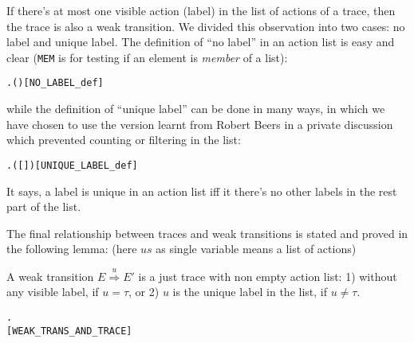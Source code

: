 If there's at most one visible action (label) in the list of actions of a trace,
then the trace is also a weak transition. We divided this observation
into two cases: no label and unique label. The definition of ``no
label'' in an action list is easy and clear (\texttt{MEM} is for
testing if an element is \emph{member} of a list):
\begin{alltt}
\HOLTokenTurnstile{}   \HOLSymConst{\HOLTokenEquiv{}} \HOLSymConst{\HOLTokenNeg{}}\HOLSymConst{\HOLTokenExists{}}.  ( ) \hfill{[NO_LABEL_def]}
\end{alltt}
while the definition of ``unique label'' can be done in many ways, in
which we have chosen to use the version learnt from Robert Beers in
a private discussion which prevented counting or filtering in the list:
\begin{alltt}
\HOLTokenTurnstile{}    \HOLSymConst{\HOLTokenEquiv{}}
   \HOLSymConst{\HOLTokenExists{}} . ( \HOLSymConst{\HOLTokenDoublePlus} [] \HOLSymConst{\HOLTokenDoublePlus}  \HOLSymConst{=} ) \HOLSymConst{\HOLTokenConj{}}   \HOLSymConst{\HOLTokenConj{}}  \hfill{[UNIQUE_LABEL_def]}
\end{alltt}
It says, a label is unique in an action list iff it there's no other
labels in the rest part of the list.

The final relationship between traces and weak transitions is stated
and proved in the following lemma: (here $us$ as single variable means
a list of actions)
\begin{lemma}
A weak transition $E\overset{u}{\Rightarrow}E'$ is a just trace with non
empty action list: 1) without any visible label, if $u = \tau$, or 2)
$u$ is the unique label in the list, if $u \neq \tau$.
\begin{alltt}
\HOLTokenTurnstile{}  \HOLTokenWeakTransBegin{}\HOLTokenWeakTransEnd {} \HOLSymConst{\HOLTokenEquiv{}}
   \HOLSymConst{\HOLTokenExists{}}.
           \HOLSymConst{\HOLTokenConj{}} \HOLSymConst{\HOLTokenNeg{}}  \HOLSymConst{\HOLTokenConj{}}   \HOLSymConst{=} \HOLSymConst{\ensuremath{\tau}}   
          \hfill{[WEAK_TRANS_AND_TRACE]}
\end{alltt}
\end{lemma}

